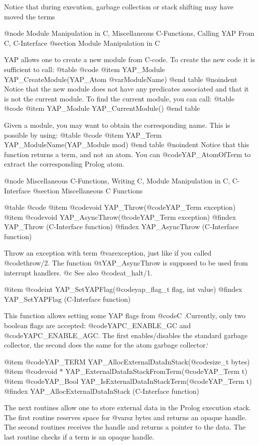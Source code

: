 Notice that during execution, garbage collection or stack shifting may
have moved the terms 

@node Module Manipulation in C, Miscellaneous C-Functions, Calling YAP From C, C-Interface
@section Module Manipulation in C

YAP allows one to create a new module from C-code. To create the new
code it is sufficient to call:
@table @code
  @item    YAP_Module      YAP_CreateModule(YAP_Atom @var{ModuleName})
@end table
@noindent
Notice that the new module does not have any predicates associated and
that it is not the current module. To find the current module, you can call:
@table @code
  @item    YAP_Module      YAP_CurrentModule()
@end table

Given a module, you may want to obtain the corresponding name. This is
possible by using:
@table @code
 @item     YAP_Term      YAP_ModuleName(YAP_Module mod)
@end table
@noindent
Notice that this function returns a term, and not an atom. You can
@code{YAP_AtomOfTerm} to extract the corresponding Prolog atom.

@node Miscellaneous C-Functions, Writing C, Module Manipulation in C, C-Interface
@section Miscellaneous C Functions

@table @code
@item  @code{void} YAP_Throw(@code{YAP_Term exception})
@item  @code{void} YAP_AsyncThrow(@code{YAP_Term exception})
@findex YAP_Throw (C-Interface function)
@findex YAP_AsyncThrow (C-Interface function)

Throw an exception with term  @var{exception}, just like if you called
@code{throw/2}. The function @t{YAP_AsyncThrow} is supposed to be used
from interrupt handlers.
@c See also @code{at_halt/1}.

@item  @code{int} YAP_SetYAPFlag(@code{yap_flag_t flag, int value})
@findex YAP_SetYAPFlag (C-Interface function)

This function allows setting some YAP flags from @code{C} .Currently,
only two boolean flags are accepted: @code{YAPC_ENABLE_GC} and
@code{YAPC_ENABLE_AGC}.  The first enables/disables the standard garbage
collector, the second does the same for the atom garbage collector.`

@item  @code{YAP_TERM} YAP_AllocExternalDataInStack(@code{size_t bytes})
@item  @code{void *} YAP_ExternalDataInStackFromTerm(@code{YAP_Term t})
@item  @code{YAP_Bool} YAP_IsExternalDataInStackTerm(@code{YAP_Term t})
@findex YAP_AllocExternalDataInStack (C-Interface function)

The next routines allow one to store external data in the Prolog
execution stack. The first routine reserves space for @var{sz} bytes
and returns an opaque handle. The second routines receives the handle
and returns a pointer to the data.  The last routine checks if a term
is an opaque handle.

